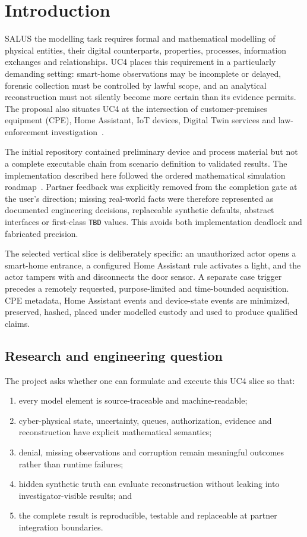 ﻿\documentclass[11pt,a4paper]{article}
\newcommand{\code}[1]{\texttt{#1}}
\begin{document}
\tableofcontents
\newpage

\section{Introduction}

SALUS the modelling task requires formal and mathematical modelling of physical entities, their digital counterparts, properties, processes, information exchanges and relationships. UC4 places this requirement in a particularly demanding setting: smart-home observations may be incomplete or delayed, forensic collection must be controlled by lawful scope, and an analytical reconstruction must not silently become more certain than its evidence permits. The proposal also situates UC4 at the intersection of customer-premises equipment (CPE), Home Assistant, IoT devices, Digital Twin services and law-enforcement investigation~\cite{proposal}.

The initial repository contained preliminary device and process material but not a complete executable chain from scenario definition to validated results. The implementation described here followed the ordered mathematical simulation roadmap~\cite{roadmap}. Partner feedback was explicitly removed from the completion gate at the user's direction; missing real-world facts were therefore represented as documented engineering decisions, replaceable synthetic defaults, abstract interfaces or first-class \code{TBD} values. This avoids both implementation deadlock and fabricated precision.

The selected vertical slice is deliberately specific: an unauthorized actor opens a smart-home entrance, a configured Home Assistant rule activates a light, and the actor tampers with and disconnects the door sensor. A separate case trigger precedes a remotely requested, purpose-limited and time-bounded acquisition. CPE metadata, Home Assistant events and device-state events are minimized, preserved, hashed, placed under modelled custody and used to produce qualified claims.

\subsection{Research and engineering question}

The project asks whether one can formulate and execute this UC4 slice so that:

\begin{enumerate}
  \item every model element is source-traceable and machine-readable;
  \item cyber-physical state, uncertainty, queues, authorization, evidence and reconstruction have explicit mathematical semantics;
  \item denial, missing observations and corruption remain meaningful outcomes rather than runtime failures;
  \item hidden synthetic truth can evaluate reconstruction without leaking into investigator-visible results; and
  \item the complete result is reproducible, testable and replaceable at partner integration boundaries.
\end{enumerate}
\end{document}
